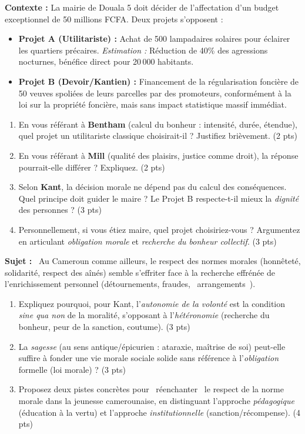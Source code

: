\documentclass[11pt]{article}
\begin{document}
\begin{exercice}
\textbf{Contexte :} La mairie de Douala 5 doit décider de l'affectation d'un budget exceptionnel de 50 millions FCFA. Deux projets s'opposent :
\begin{itemize}
    \item \textbf{Projet A (Utilitariste) :} Achat de 500 lampadaires solaires pour éclairer les quartiers précaires. \textit{Estimation :} Réduction de 40\% des agressions nocturnes, bénéfice direct pour 20\,000 habitants.
    \item \textbf{Projet B (Devoir/Kantien) :} Financement de la régularisation foncière de 50 veuves spoliées de leurs parcelles par des promoteurs, conformément à la loi sur la propriété foncière, mais sans impact statistique massif immédiat.
\end{itemize}
\begin{enumerate}
    \item En vous référant à \textbf{Bentham} (calcul du bonheur : intensité, durée, étendue), quel projet un utilitariste classique choisirait-il ? Justifiez brièvement. \hfill (2 pts)
    \item En vous référant à \textbf{Mill} (qualité des plaisirs, justice comme droit), la réponse pourrait-elle différer ? Expliquez. \hfill (2 pts)
    \item Selon \textbf{Kant}, la décision morale ne dépend pas du calcul des conséquences. Quel principe doit guider le maire ? Le Projet B respecte-t-il mieux la \textit{dignité} des personnes ? \hfill (3 pts)
    \item Personnellement, si vous étiez maire, quel projet choisiriez-vous ? Argumentez en articulant \textit{obligation morale} et \textit{recherche du bonheur collectif}. \hfill (3 pts)
\end{enumerate}
\end{exercice}

\begin{exercice}
\textbf{Sujet :} \og~Au Cameroun comme ailleurs, le respect des normes morales (honnêteté, solidarité, respect des aînés) semble s'effriter face à la recherche effrénée de l'enrichissement personnel (détournements, fraudes, \og~arrangements~{}).~{}
\begin{enumerate}
    \item Expliquez pourquoi, pour Kant, l'\textit{autonomie de la volonté} est la condition \textit{sine qua non} de la moralité, s'opposant à l'\textit{hétéronomie} (recherche du bonheur, peur de la sanction, coutume). \hfill (3 pts)
    \item La \textit{sagesse} (au sens antique/épicurien : ataraxie, maîtrise de soi) peut-elle suffire à fonder une vie morale sociale solide sans référence à l'\textit{obligation} formelle (loi morale) ? \hfill (3 pts)
    \item Proposez deux pistes concrètes pour \og~réenchanter~{} le respect de la norme morale dans la jeunesse camerounaise, en distinguant l'approche \textit{pédagogique} (éducation à la vertu) et l'approche \textit{institutionnelle} (sanction/récompense). \hfill (4 pts)
\end{enumerate}
\end{exercice}
\end{document}
